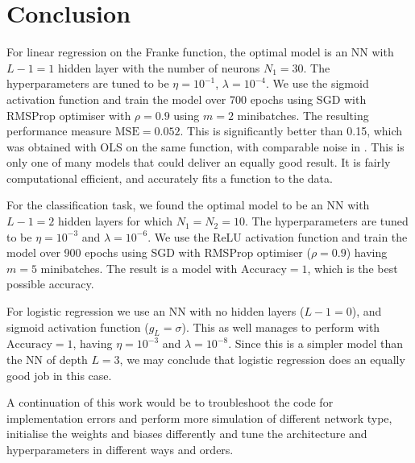 \section{Conclusion}\label{sec:conclusion}

For linear regression on the Franke function, the optimal model is an NN with $L-1=1$ hidden layer with the number of neurons $N_1=30$. The hyperparameters are tuned to be $\eta=10^{-1}$, $\lambda=10^{-4}$. We use the sigmoid activation function and train the model over 700 epochs using SGD with RMSProp optimiser with $\rho=0.9$ using $m=2$ minibatches. The resulting performance measure $\mathrm{MSE} = 0.052$. This is significantly better than 0.15, which was obtained with OLS on the same function, with comparable noise in \projectOne. This is only one of many models that could deliver an equally good result. It is fairly computational efficient, and accurately fits a function to the data. 

For the classification task, we found the optimal model to be an NN with $L-1=2$ hidden layers for which $N_1=N_2=10$. The hyperparameters are tuned to be $\eta=10^{-3}$ and $\lambda=10^{-6}$. We use the ReLU activation function and train the model over 900 epochs using SGD with RMSProp optimiser ($\rho=0.9$) having $m=5$ minibatches. The result is a model with $\mathrm{Accuracy}=1$, which is the best possible accuracy. 

For logistic regression we use an NN with no hidden layers ($L-1=0$), and sigmoid activation function ($g_L=\sigma$). This as well manages to perform with $\mathrm{Accuracy}=1$, having $\eta=10^{-3}$ and $\lambda=10^{-8}$. Since this is a simpler model than the NN of depth $L=3$, we may conclude that logistic regression does an equally good job in this case. 

A continuation of this work would be to troubleshoot the code for implementation errors and perform more simulation of different network type, initialise the weights and biases differently and tune the architecture and hyperparameters in different ways and orders. 